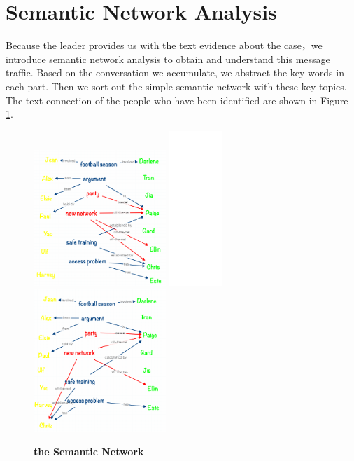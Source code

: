 \documentclass[12pt]{article}
\begin{document}
\section{Semantic Network Analysis}
	Because the leader provides us with the text evidence about the case，we introduce semantic network analysis to obtain and understand this message traffic. Based on the conversation we accumulate, we abstract the key words in each part. Then we sort out the simple semantic network with these key topics. The text connection of the people who have been identified are shown in Figure \ref{F1}.

\begin{figure}[!htb]
\centering
\includegraphics[width=5cm]{netwrok1.png}
\includegraphics[width=2cm]{white.png}
\includegraphics[width=5cm]{network2.png}
\caption{\textbf{the Semantic Network}}
\label{F1}
\end{figure}
\end{document}
